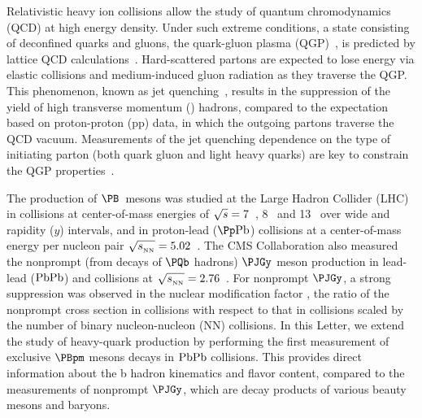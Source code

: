 
\maketitle
Relativistic heavy ion collisions allow the study of quantum chromodynamics (QCD) at high energy density.
Under such extreme conditions, a state consisting of deconfined quarks and gluons, the quark-gluon plasma (QGP)~\cite{QGP1,QGP2}, is predicted by lattice QCD calculations~\cite{Karsch:2003jg}.
Hard-scattered partons are expected to lose energy via elastic collisions and medium-induced gluon radiation as they traverse the QGP. This phenomenon, known as jet quenching~\cite{Eloss1,Baier:2000mf,Chatrchyan:2011sx,Aad:2010bu}, results in the suppression of the yield of high transverse momentum (\pt) hadrons, compared to the  expectation based on proton-proton (pp) data, in which the outgoing partons traverse the QCD vacuum. Measurements of the jet quenching dependence on the type of initiating parton (both quark \vs gluon and light \vs heavy quarks) are key to constrain the QGP properties~\cite{Dokshitzer:2001zm,Armesto:2003jh,Wicks:2007am,Zhang:2003wk,Adil:2006ra}.

The production of $\PB$~mesons was studied at the Large Hadron Collider (LHC) in \pp collisions at center-of-mass energies of $\sqrt{s} = 7$\TeV~\cite{CMSBmesonpp,Chatrchyan:2011pw,Chatrchyan:2011vh,ATLAS:2013cia,LHCb:2013JHEP,Aaij:2014hla,Aaij:2012dd}, 8\TeV~\cite{Aaij:2015fea,Aaij:2014ija} and 13\TeV~\cite{Khachatryan:2016csy} over wide \pt and rapidity ($y$) intervals, and in proton-lead ($\pPb$) collisions at a center-of-mass energy per nucleon pair $\sqrtsNN = 5.02$\TeV~\cite{Khachatryan:2015uja}.
The CMS Collaboration also measured the nonprompt (\ie from decays of $\PQb$ hadrons) $\PJGy$ meson production in lead-lead ($\mathrm{PbPb}$) and \pp collisions at $\sqrtsNN = 2.76$\TeV~\cite{CMSNonPromptJpsi}. For nonprompt $\PJGy$, a strong suppression was observed in the nuclear modification factor \RAA, the ratio of the nonprompt \PJGy cross section in \PbPb collisions with respect to that in \pp collisions scaled by the number of binary nucleon-nucleon (NN) collisions. In this Letter, we extend the study of heavy-quark production by performing the first measurement of exclusive $\PBpm$ mesons decays in $\mathrm{PbPb}$ collisions. This provides direct information about the b hadron kinematics and flavor content, compared to the measurements of nonprompt $\PJGy$, which are decay products of various beauty mesons and baryons.


